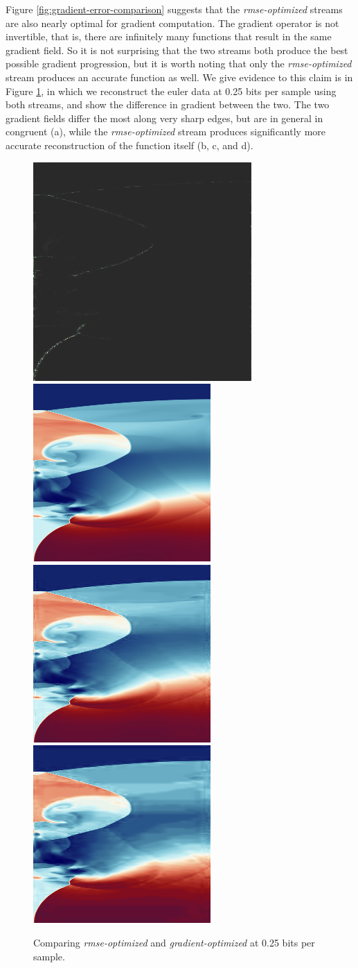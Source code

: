 Figure \ref{fig:gradient-error-comparison} suggests that the \emph{rmse-optimized} streams are also
nearly optimal for gradient computation. The gradient operator is not invertible, that is, there are
infinitely many functions that result in the same gradient field. So it is not surprising that the
two streams both produce the best possible gradient progression, but it is worth noting that only
the \emph{rmse-optimized} stream produces an accurate function as well. We give evidence to this
claim is in Figure \ref{fig:gradient-comparison}, in which we reconstruct the euler data at 0.25
bits per sample using both streams, and show the difference in gradient between the two. The two
gradient fields differ the most along very sharp edges, but are in general in congruent (a), while
the \emph{rmse-optimized} stream produces significantly more accurate reconstruction of the function
itself (b, c, and d).

\begin{figure}
	\centering
	{\includegraphics[width=0.24\linewidth]{img/gradient-laplacian/grad-diff.png}}
	{\includegraphics[width=0.24\linewidth]{img/gradient-laplacian/euler-original.png}}
	{\includegraphics[width=0.24\linewidth]{img/gradient-laplacian/euler-rmse.png}}
	{\includegraphics[width=0.24\linewidth]{img/gradient-laplacian/euler-gradient.png}}
	\caption{Comparing \emph{rmse-optimized} and \emph{gradient-optimized} at 0.25 bits per sample. }
	\label{fig:gradient-comparison}
\end{figure}

